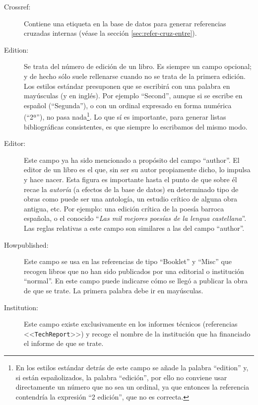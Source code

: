 \documentclass[a4paper,11pt]{article}
\def\ltr#1-{<<\texttt{#1}>>}
\begin{document}
\begin{description}
\item[Crossref:]  Contiene una  etiqueta  en  la base  de  datos para  generar
  referencias cruzadas internas (véase la sección \ref{sec:refer-cruz-entre}).

\item[Edition:] Se  trata del  número de  edición de un  libro. Es  siempre un
  campo opcional;  y de hecho sólo suele  rellenarse cuando no se  trata de la
  primera edición.  Los  estilos estándar presuponen que se  escribirá con una
  palabra en mayúsculas  (y en inglés).  Por ejemplo  ``Second'', aunque si se
  escribe  en español  (``Segunda''),  o  con un  ordinal  expresado en  forma
  numérica (``2ª''),  no pasa nada\footnote{En los estilos  estándar detrás de
    este campo se  añade la palabra ``edition'' y,  si están españolizados, la
    palabra ``edición'', por ello no  conviene usar directamente un número que
    no sea un  ordinal, ya que entonces la  referencia contendría la expresión
    ``2  edición'', que  no  es correcta.}.   Lo  que sí  es importante,  para
  generar listas bibliográficas consistentes, es que siempre lo escribamos del
  mismo modo.

\item[Editor:]  Este  campo  ya  ha  sido mencionado  a  propósito  del  campo
  ``author''.  El editor  de un libro es el que, sin  ser su autor propiamente
  dicho, lo impulsa y hace nacer.  Esta figura es importante hasta el punto de
  que sobre  él recae  la \emph{autoría} (a  efectos de  la base de  datos) en
  determinado tipo de  obras como puede ser una  antología, un estudio crítico
  de alguna obra  antigua, etc. Por ejemplo: una edición  crítica de la poesía
  barroca española, o el conocido ``\emph{Las mil mejores poesías de la lengua
    castellana}''.  Las reglas relativas a  este campo son similares a las del
  campo ``author''.

\item[Howpublished:] Este campo se usa  en las referencias de tipo ``Booklet''
  y ``Misc'' que recogen libros que no han sido publicados por una editorial o
  institución  ``normal''. En  este  campo  puede indicarse  cómo  se llegó  a
  publicar la obra de que se trate. La primera palabra debe ir en mayúsculas.

\item[Institution:] Este campo existe  exclusivamente en los informes técnicos
  (referencias \ltr TechReport-)  y recoge el nombre de  la institución que ha
  financiado el informe de que se trate.


\end{description}
\end{document}
